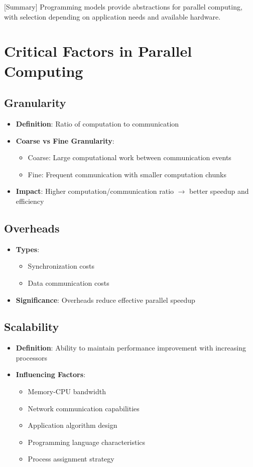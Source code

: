 \documentclass[12pt]{article}
\begin{document}
[Summary] Programming models provide abstractions for parallel computing, with selection depending on application needs and available hardware.

\section{Critical Factors in Parallel Computing}

\subsection{Granularity}
\begin{itemize}
  \item \textbf{Definition}: Ratio of computation to communication
  \item \textbf{Coarse vs Fine Granularity}:
        \begin{itemize}
          \item Coarse: Large computational work between communication events
          \item Fine: Frequent communication with smaller computation chunks
        \end{itemize}
  \item \textbf{Impact}: Higher computation/communication ratio $\rightarrow$ better speedup and efficiency
\end{itemize}

\subsection{Overheads}
\begin{itemize}
  \item \textbf{Types}:
        \begin{itemize}
          \item Synchronization costs
          \item Data communication costs
        \end{itemize}
  \item \textbf{Significance}: Overheads reduce effective parallel speedup
\end{itemize}

\subsection{Scalability}
\begin{itemize}
  \item \textbf{Definition}: Ability to maintain performance improvement with increasing processors
  \item \textbf{Influencing Factors}:
        \begin{itemize}
          \item Memory-CPU bandwidth
          \item Network communication capabilities
          \item Application algorithm design
          \item Programming language characteristics
          \item Process assignment strategy
        \end{itemize}
\end{itemize}
\end{document}
